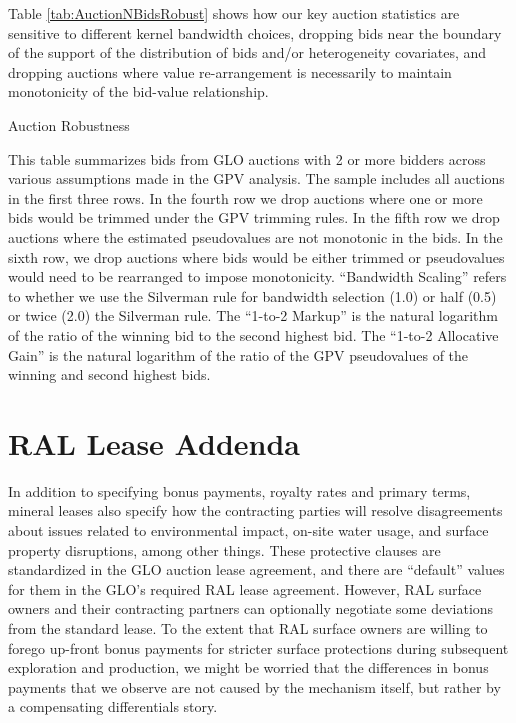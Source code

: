 \begin{appendices}
Table \ref{tab:AuctionNBidsRobust} shows how our key auction statistics are sensitive to different kernel bandwidth choices, dropping bids near the boundary of the support of the distribution of bids and/or heterogeneity covariates, and dropping auctions where value re-arrangement is necessarily to maintain monotonicity of the bid-value relationship.
\addtolength{\tabcolsep}{4pt}
\begin{table}[H]
\begin{center}
\begin{threeparttable}
	\caption{Auction Robustness}
	\label{tab:AuctionNBidsRobust}
 	\small
   	            
    \footnotesize
    \begin{tablenotes}
    	\item This table summarizes bids from GLO auctions with 2 or more bidders across various assumptions made in the GPV analysis.  The sample includes all auctions in the first three rows.  In the fourth row we drop auctions where one or more bids would be trimmed under the GPV trimming rules.  In the fifth row we drop auctions where the estimated pseudovalues are not monotonic in the bids.  In the sixth row, we drop auctions where bids would be either trimmed or pseudovalues would need to be rearranged to impose monotonicity. ``Bandwidth Scaling'' refers to whether we use the Silverman rule for bandwidth selection (1.0) or half (0.5) or twice (2.0) the Silverman rule. The ``1-to-2 Markup'' is the natural logarithm of the ratio of the winning bid to the second highest bid.  The ``1-to-2 Allocative Gain'' is the natural logarithm of the ratio of the GPV pseudovalues of the winning and second highest bids.
    \end{tablenotes}
\end{threeparttable}
\end{center}
\end{table}

\pagebreak

\section{RAL Lease Addenda}\label{sec:Appendix_Addenda}
In addition to specifying bonus payments, royalty rates and primary terms, mineral leases also specify how the contracting parties will resolve disagreements about issues related to environmental impact, on-site water usage, and surface property disruptions, among other things.  These protective clauses are standardized in the GLO auction lease agreement, and there are ``default'' values for them in the GLO's required RAL lease agreement.  However, RAL surface owners and their contracting partners can optionally negotiate some deviations from the standard lease.  To the extent that RAL surface owners are willing to forego up-front bonus payments for stricter surface protections during subsequent exploration and production, we might be worried that the differences in bonus payments that we observe are not caused by the mechanism itself, but rather by a compensating differentials story.  


\end{appendices}

